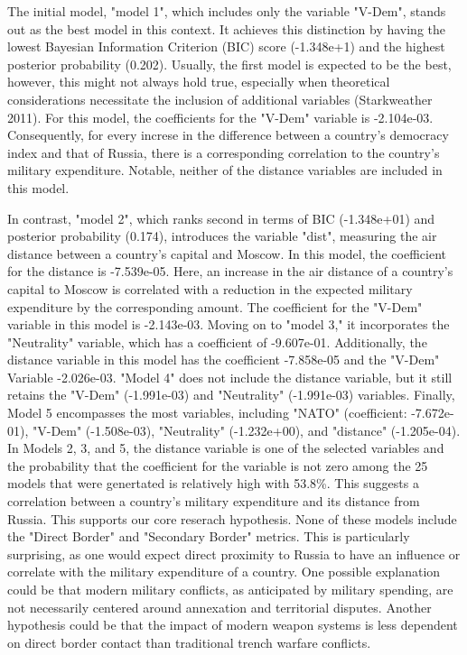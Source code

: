 \documentclass[12pt,a4paper]{article}
\begin{document}
The initial model, "model 1", which includes only the variable "V-Dem", stands out as the best model in this context. It achieves this distinction by having the lowest Bayesian Information Criterion (BIC) score (-1.348e+1) and the highest posterior probability (0.202). Usually, the first model is expected to be the best, however, this might not always hold true, especially when theoretical considerations necessitate the inclusion of additional variables (Starkweather 2011). For this model, the coefficients for the "V-Dem" variable is -2.104e-03. Consequently, for every increse in the difference between a country's democracy index and that of Russia, there is a corresponding correlation to the country's military expenditure. Notable, neither of the distance variables are included in this model. 

In contrast, "model 2", which ranks second in terms of BIC (-1.348e+01) and posterior probability (0.174), introduces the variable "dist", measuring the air distance between a country's capital and Moscow. In this model, the coefficient for the distance is -7.539e-05. Here, an increase in the air distance of a country's capital to Moscow is correlated with a reduction in the expected military expenditure by the corresponding amount. The coefficient for the "V-Dem" variable in this model is -2.143e-03. Moving on to "model 3," it incorporates the "Neutrality" variable, which has a coefficient of -9.607e-01. Additionally, the distance variable in this model has the coefficient -7.858e-05 and the "V-Dem" Variable -2.026e-03. "Model 4" does not include the distance variable, but it still retains the "V-Dem" (-1.991e-03) and "Neutrality" (-1.991e-03) variables. Finally, Model 5 encompasses the most variables, including "NATO" (coefficient: -7.672e-01), "V-Dem" (-1.508e-03), "Neutrality" (-1.232e+00), and "distance" (-1.205e-04).\\

In Models 2, 3, and 5, the distance variable is one of the selected variables and the probability that the coefficient for the variable is not zero among the 25 models that were genertated is relatively high with 53.8\%. This suggests a correlation between a country's military expenditure and its distance from Russia. This supports our core reserach hypothesis. None of these models include the "Direct Border" and "Secondary Border" metrics. This is particularly surprising, as one would expect direct proximity to Russia to have an influence or correlate with the military expenditure of a country. One possible explanation could be that modern military conflicts, as anticipated by military spending, are not necessarily centered around annexation and territorial disputes. Another hypothesis could be that the impact of modern weapon systems is less dependent on direct border contact than traditional trench warfare conflicts.
\end{document}
